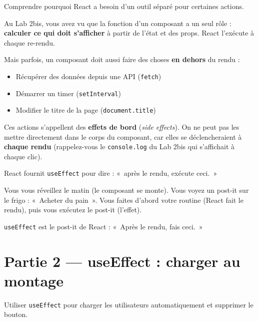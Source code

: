 \documentclass[11pt,a4paper]{article}
\begin{document}
\begin{objectifbox}
Comprendre pourquoi React a besoin d'un outil séparé pour certaines actions.
\end{objectifbox}

Au Lab 2bis, vous avez vu que la fonction d'un composant a un seul rôle : \textbf{calculer ce qui doit s'afficher} à partir de l'état et des props. React l'exécute à chaque re-rendu.

Mais parfois, un composant doit aussi faire des choses \textbf{en dehors} du rendu :
\begin{itemize}[nosep]
\item Récupérer des données depuis une API (\texttt{fetch})
\item Démarrer un timer (\texttt{setInterval})
\item Modifier le titre de la page (\texttt{document.title})
\end{itemize}

Ces actions s'appellent des \textbf{effets de bord} (\emph{side effects}). On ne peut pas les mettre directement dans le corps du composant, car elles se déclencheraient à \textbf{chaque rendu} (rappelez-vous le \texttt{console.log} du Lab 2bis qui s'affichait à chaque clic).

React fournit \texttt{useEffect} pour dire : «~après le rendu, exécute ceci.~»

\begin{infobox}
Vous vous réveillez le matin (le composant se monte). Vous voyez un post-it sur le frigo : «~Acheter du pain~». Vous faites d'abord votre routine (React fait le rendu), puis vous exécutez le post-it (l'effet).

\texttt{useEffect} est le post-it de React : «~Après le rendu, fais ceci.~»
\end{infobox}

\section{Partie 2 --- useEffect : charger au montage}

\begin{objectifbox}
Utiliser \texttt{useEffect} pour charger les utilisateurs automatiquement et supprimer le bouton.
\end{objectifbox}
\end{document}
